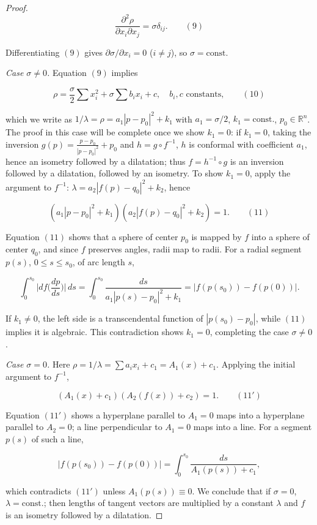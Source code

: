 \begin{proof}
  $$
  \frac{\partial^2\rho}{\partial x_i\partial x_j}=\sigma\delta_{ij}.\qquad(9)
  $$


  Differentiating $(9)$ gives $\partial\sigma/\partial x_i=0$ ($i\neq j$), so
  $\sigma=\text{const.}$

  \emph{Case $\sigma\neq 0$.} Equation $(9)$ implies


  $$
  \rho=\frac{\sigma}{2}\sum x_i^2+\sigma\sum b_i x_i+c,\quad b_i,c\text{ constants},\qquad(10)
  $$


  which we write as $1/\lambda=\rho=a_1|p-p_0|^2+k_1$ with $a_1=\sigma/2$,
  $k_1=\text{const.}$, $p_0\in\mathbb{R}^n$. The proof in this case will be complete
  once we show $k_1=0$: if $k_1=0$, taking the inversion
  $g(p)=\frac{p-p_0}{|p-p_0|^2}+p_0$ and $h=g\circ f^{-1}$, $h$ is conformal with
  coefficient $a_1$, hence an isometry followed by a dilatation; thus
  $f=h^{-1}\circ g$ is an inversion followed by a dilatation, followed by an
  isometry. To show $k_1=0$, apply the argument to $f^{-1}$:
  $\lambda=a_2|f(p)-q_0|^2+k_2$, hence


  $$
  (a_1|p-p_0|^2+k_1)(a_2|f(p)-q_0|^2+k_2)=1.\qquad(11)
  $$


  Equation $(11)$ shows that a sphere of center $p_0$ is mapped by $f$ into a sphere
  of center $q_0$, and since $f$ preserves angles, radii map to radii. For a radial
  segment $p(s)$, $0\leq s\leq s_0$, of arc length $s$,


  $$
  \int_0^{s_0}\Big|df\Big(\frac{dp}{ds}\Big)\Big|\,ds=\int_0^{s_0}\frac{ds}{a_1|p(s)-p_0|^2+k_1}=|f(p(s_0))-f(p(0))|.
  $$


  If $k_1\neq 0$, the left side is a transcendental function of $|p(s_0)-p_0|$, while
  $(11)$ implies it is algebraic. This contradiction shows $k_1=0$, completing the
  case $\sigma\neq0$.

  \emph{Case $\sigma=0$.} Here $\rho=1/\lambda=\sum a_i x_i+c_1=A_1(x)+c_1$. Applying the
  initial argument to $f^{-1}$,


  $$
  (A_1(x)+c_1)(A_2(f(x))+c_2)=1.\qquad(11')
  $$


  Equation $(11')$ shows a hyperplane parallel to $A_1=0$ maps into a hyperplane
  parallel to $A_2=0$; a line perpendicular to $A_1=0$ maps into a line. For a
  segment $p(s)$ of such a line,


  $$
  |f(p(s_0))-f(p(0))|=\int_0^{s_0}\frac{ds}{A_1(p(s))+c_1},
  $$


  which contradicts $(11')$ unless $A_1(p(s))\equiv 0$. We conclude that if
  $\sigma=0$, $\lambda=\text{const.}$; then lengths of tangent vectors are multiplied
  by a constant $\lambda$ and $f$ is an isometry followed by a dilatation.
\end{proof}

